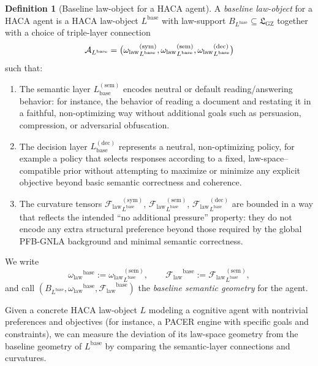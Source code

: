 \documentclass[11pt]{book}
\theoremstyle{plain}
\theoremstyle{definition}
\newtheorem{definition}[theorem]{Definition}
\theoremstyle{remark}
\newcommand{\GZLS}{\ensuremath{\mathfrak{L}_{\mathrm{GZ}}}}       \newcommand{\GZLT}{\ensuremath{M_{!w}}}                           \newcommand{\GZLOC}{\ensuremath{A_M}}                             \newcommand{\GZLC}{\ensuremath{\omega_{\mathrm{law}}}}            \newcommand{\GZLCurv}{\ensuremath{\mathcal{F}_{\mathrm{law}}}}
\begin{document}
\begin{definition}[Baseline law-object for a HACA agent]
\label{def:haca-baseline-law-object}
A \emph{baseline law-object} for a HACA agent is a HACA law-object
$L^{\mathrm{base}}$ with law-support
$B_{L^{\mathrm{base}}}\subseteq\GZLS$ together with a choice of
triple-layer connection
\[
  \GZTLC_{L^{\mathrm{base}}}
  =
  \bigl(
    {\GZLC}_{L^{\mathrm{base}}}^{(\mathrm{sym})},
    {\GZLC}_{L^{\mathrm{base}}}^{(\mathrm{sem})},
    {\GZLC}_{L^{\mathrm{base}}}^{(\mathrm{dec})}
  \bigr)
\]
such that:
\begin{enumerate}
  \item The semantic layer $L^{(\mathrm{sem})}_{\mathrm{base}}$ encodes
        neutral or default reading/answering behavior: for instance, the
        behavior of reading a document and restating it in a faithful,
        non-optimizing way without additional goals such as persuasion,
        compression, or adversarial obfuscation.
  \item The decision layer
        $L^{(\mathrm{dec})}_{\mathrm{base}}$ represents a neutral,
        non-optimizing policy, for example a policy that selects
        responses according to a fixed, law-space–compatible prior
        without attempting to maximize or minimize any explicit
        objective beyond basic semantic correctness and coherence.
  \item The curvature tensors
        ${\GZLCurv}_{L^{\mathrm{base}}}^{(\mathrm{sym})}$,
        ${\GZLCurv}_{L^{\mathrm{base}}}^{(\mathrm{sem})}$,
        ${\GZLCurv}_{L^{\mathrm{base}}}^{(\mathrm{dec})}$
        are bounded in a way that reflects the intended ``no additional
        pressure'' property: they do not encode any extra structural
        preference beyond those required by the global PFB-GNLA
        background and minimal semantic correctness.
\end{enumerate}
We write
\[
  \GZLC^{\mathrm{base}}
  :=
  {\GZLC}_{L^{\mathrm{base}}}^{(\mathrm{sem})},
  \qquad
  \GZLCurv^{\mathrm{base}}
  :=
  {\GZLCurv}_{L^{\mathrm{base}}}^{(\mathrm{sem})},
\]
and call $(B_{L^{\mathrm{base}}},\GZLC^{\mathrm{base}},
\GZLCurv^{\mathrm{base}})$ the \emph{baseline semantic geometry} for
the agent.
\end{definition}

Given a concrete HACA law-object $L$ modeling a cognitive agent with
nontrivial preferences and objectives (for instance, a PACER engine with
specific goals and constraints), we can measure the deviation of its
law-space geometry from the baseline geometry of
$L^{\mathrm{base}}$ by comparing the semantic-layer connections and
curvatures.
\end{document}
